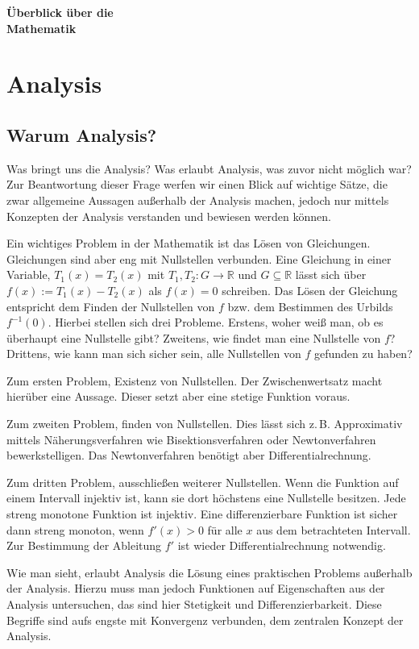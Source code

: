 \documentclass[a4paper,10pt,fleqn,twocolumn,twoside]{scrartcl}
\newcommand{\R}{\mathbb R}
\begin{document}
\thispagestyle{empty}

\noindent
{\LARGE\textbf{Überblick über die\\
Mathematik}\par}

\tableofcontents

\section{Analysis}
\subsection{Warum Analysis?}
Was bringt uns die Analysis? Was erlaubt Analysis, was zuvor nicht
möglich war? Zur Beantwortung dieser Frage werfen wir einen Blick
auf wichtige Sätze, die zwar allgemeine Aussagen außerhalb
der Analysis machen, jedoch nur mittels Konzepten der Analysis
verstanden und bewiesen werden können.

Ein wichtiges Problem in der Mathematik ist das Lösen von Gleichungen.
Gleichungen sind aber eng mit Nullstellen verbunden. Eine
Gleichung in einer Variable, $T_1(x)=T_2(x)$ mit $T_1,T_2\colon G\to\R$
und $G\subseteq\R$ lässt sich über $f(x):=T_1(x)-T_2(x)$ als
$f(x)=0$ schreiben. Das Lösen der Gleichung entspricht dem Finden der
Nullstellen von $f$ bzw. dem Bestimmen des Urbilds $f^{-1}(0)$.
Hierbei stellen sich drei Probleme. Erstens, woher weiß man, ob
es überhaupt eine Nullstelle gibt? Zweitens, wie findet man eine
Nullstelle von $f$? Drittens, wie kann man sich sicher sein, alle
Nullstellen von $f$ gefunden zu haben?

Zum ersten Problem, Existenz von Nullstellen. Der Zwischenwertsatz
macht hierüber eine Aussage. Dieser setzt aber eine stetige Funktion
voraus.

Zum zweiten Problem, finden von Nullstellen. Dies lässt sich z.\,B.
Approximativ mittels Näherungsverfahren wie Bisektionsverfahren
oder Newtonverfahren bewerkstelligen. Das Newtonverfahren benötigt
aber Differentialrechnung.

Zum dritten Problem, ausschließen weiterer Nullstellen. Wenn die
Funktion auf einem Intervall injektiv ist, kann sie dort höchstens
eine Nullstelle besitzen. Jede streng monotone Funktion ist injektiv.
Eine differenzierbare Funktion ist sicher dann streng monoton, wenn
$f'(x)>0$ für alle $x$ aus dem betrachteten Intervall. Zur Bestimmung
der Ableitung $f'$ ist wieder Differentialrechnung notwendig.

Wie man sieht, erlaubt Analysis die Lösung eines praktischen Problems
außerhalb der Analysis. Hierzu muss man jedoch Funktionen auf
Eigenschaften aus der Analysis untersuchen, das sind hier
Stetigkeit und Differenzierbarkeit. Diese Begriffe sind aufs
engste mit Konvergenz verbunden, dem zentralen Konzept der Analysis.
\end{document}
